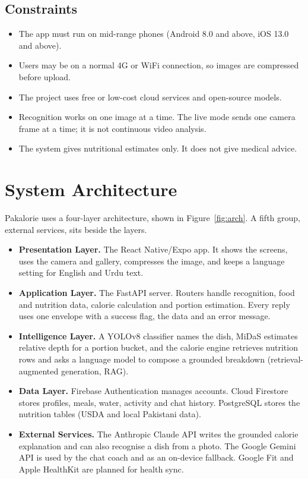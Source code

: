 \subsection{Constraints}
\begin{itemize}[noitemsep]
  \item The app must run on mid-range phones (Android 8.0 and above, iOS 13.0 and above).
  \item Users may be on a normal 4G or WiFi connection, so images are compressed before upload.
  \item The project uses free or low-cost cloud services and open-source models.
  \item Recognition works on one image at a time. The live mode sends one camera frame at a
        time; it is not continuous video analysis.
  \item The system gives nutritional estimates only. It does not give medical advice.
\end{itemize}

\section{System Architecture}
Pakalorie uses a four-layer architecture, shown in Figure~\ref{fig:arch}. A fifth group,
external services, sits beside the layers.
\begin{itemize}[noitemsep]
  \item \textbf{Presentation Layer.} The React Native/Expo app. It shows the screens, uses the
        camera and gallery, compresses the image, and keeps a language setting for English and
        Urdu text.
  \item \textbf{Application Layer.} The FastAPI server. Routers handle recognition, food and
        nutrition data, calorie calculation and portion estimation. Every reply uses one
        envelope with a success flag, the data and an error message.
  \item \textbf{Intelligence Layer.} A YOLOv8 classifier names the dish, MiDaS estimates relative
        depth for a portion bucket, and the calorie engine retrieves nutrition rows and asks a
        language model to compose a grounded breakdown (retrieval-augmented generation, RAG).
  \item \textbf{Data Layer.} Firebase Authentication manages accounts. Cloud Firestore stores
        profiles, meals, water, activity and chat history. PostgreSQL stores the nutrition tables
        (USDA and local Pakistani data).
  \item \textbf{External Services.} The Anthropic Claude API writes the grounded calorie
        explanation and can also recognise a dish from a photo. The Google Gemini API is used by
        the chat coach and as an on-device fallback. Google Fit and Apple HealthKit are planned for
        health sync.
\end{itemize}


